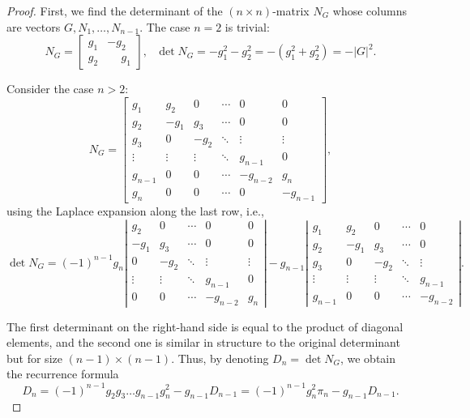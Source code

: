 \documentclass[10pt,reqno]{amsart}
\theoremstyle{plain}
\theoremstyle{remark}
\begin{document}
\begin{proof}
First, we find the determinant of the $(n \times n)$-matrix $N_G$ whose columns are vectors $G,N_1,\dots,N_{n-1}$. The case $n = 2$ is trivial:
\[
  N_G = \left[ \begin{array}{cc}
    g_1 & -g_2 \\
    g_2 & \phantom{-}g_1
  \end{array} \right], \ \ \ \det N_G = -g_1^2 - g_2^2 = -(g_1^2 + g_2^2) = -|G|^2.
\]

Consider the case $n > 2$:
\[
  N_G = \left[
    \begin{array}{cccccc}
      g_1 & g_2 & 0 & \cdots & 0 & 0  \\
      g_2 & -g_1 & g_3 & \cdots & 0 & 0 \\
      g_3 & 0 & -g_2 & \ddots & \vdots & \vdots \\
      \vdots & \vdots & \vdots & \ddots & g_{n-1} & 0 \\
      g_{n-1} & 0 & 0 & \cdots & -g_{n-2} & g_n \\
      g_n & 0 & 0 & \cdots & 0 & -g_{n-1}
    \end{array}
  \right],
\]
using the Laplace expansion along the last row, i.e.,
\[
  \det N_G = (-1)^{n-1} g_n \left|
    \begin{array}{cccccc}
      g_2 & 0 & \cdots & 0 & 0 \\
      -g_1 & g_3 & \cdots & 0 & 0 \\
      0 & -g_2 & \ddots & \vdots & \vdots \\
      \vdots & \vdots & \ddots & g_{n-1} & 0 \\
      0 & 0 & \cdots & -g_{n-2} & g_n
    \end{array}
  \right| - g_{n-1} \left|
    \begin{array}{cccccc}
      g_1 & g_2 & 0 & \cdots & 0 \\
      g_2 & -g_1 & g_3 & \cdots & 0 \\
      g_3 & 0 & -g_2 & \ddots & \vdots \\
      \vdots & \vdots & \vdots & \ddots & g_{n-1} \\
      g_{n-1} & 0 & 0 & \cdots & -g_{n-2}
    \end{array}
  \right|.
\]

The first determinant on the right-hand side is equal to the product of diagonal elements, and the second one is similar in structure to the original determinant but for size $(n-1) \times (n-1)$. Thus, by denoting $D_n = \det N_G$, we obtain the recurrence formula
\begin{equation}\label{eqDnRecurrent}
  D_n = (-1)^{n-1} g_2 g_3 \dots g_{n-1} g_n^2 - g_{n-1} D_{n-1} = (-1)^{n-1} g_n^2 \pi_n - g_{n-1} D_{n-1}.
\end{equation}


\end{proof}
\end{document}

